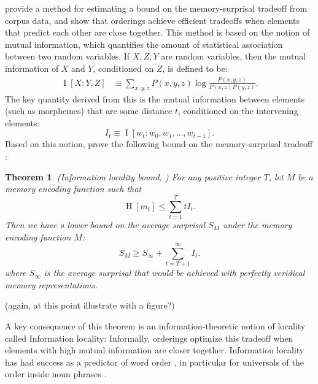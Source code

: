 \documentclass[11pt,letterpaper]{article}
\newcommand\mhahn[1]{{\color{red}(#1)}}
\newcounter{theorem}
\newtheorem{thm}[theorem]{Theorem}
\begin{document}
\citet{Hahn2020modeling} provide a method for estimating a bound on the memory-surprisal tradeoff from corpus data, and show that orderings achieve efficient tradeoffs when elements that predict each other are close together.
This method is based on the notion of mutual information, which quantifies the amount of statistical association between two random variables.
If $X, Z, Y$ are random variables, then the mutual information of $X$ and $Y$, conditioned on $Z$, is defined to be:
\begin{align}
\label{eq:mi}
    \operatorname{I}[X:Y,Z] &\equiv \sum_{x,y,z} P(x,y,z) \log \frac{P(x,y,z)}{P(x,z)P(y,z)}. %
\end{align}
The key quantity derived from this is the mutual information between elements (such as morphemes) that are some distance $t$, conditioned on the intervening elements:
\begin{equation*}
    I_t \equiv \operatorname{I}[w_t : w_0 , w_1, \dots, w_{t-1}].
\end{equation*}
Based on this notion, \citet{Hahn2020modeling}  prove the following bound on the memory-surprisal tradeoff :
\begin{thm}\label{prop:suboptimal}(Information locality bound, \citet{Hahn2020modeling})
For any positive integer $T$, let $M$ be a memory encoding function such that
\begin{equation}
\label{eq:memory-bound}
\operatorname{H}[m_t] \le \sum_{t=1}^T t I_t.
\end{equation}
Then we have a lower bound on the average surprisal $S_M$ under the memory encoding function $M$:
\begin{equation}
\label{eq:surprisal-bound}
S_M \ge S_\infty + \sum_{t=T+1}^\infty I_t.
\end{equation}
where $S_\infty$ is the average surprisal that would be achieved with perfectly veridical memory representations.
\end{thm}

\mhahn{again, at this point illustrate with a figure?}

A key consequence of this theorem is an information-theoretic notion of locality called Information locality:
Informally, orderings optimize this tradeoff when elements with high mutual information are closer together.
Information locality has had success as a predictor of word order \citep{futrell2019information}, in particular for universals of the order inside noun phrases \citep{culbertson2020from,hahn-information-theoretic-2018,DBLP:conf/acl/FutrellDS20}.
\end{document}
